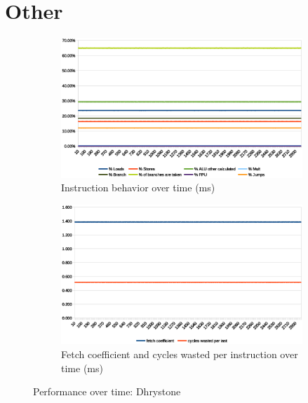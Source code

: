 \documentclass[../bachelor_paper.tex]{subfiles}
\begin{document}
\FloatBarrier
\section{Other}
\begin{figure}
    \begin{subfigure}{0.45\textwidth}
        \includegraphics[width=\textwidth]{img/graph/riscv/dhrystone_inst.eps}
        \caption{Instruction behavior over time (ms)}
    \end{subfigure}
    \begin{subfigure}{0.45\textwidth}
        \includegraphics[width=\textwidth]{img/graph/riscv/dhrystone_fetch_waste.eps}
        \caption{Fetch coefficient and cycles wasted per instruction over time (ms)}
    \end{subfigure}
    \caption{Performance over time: Dhrystone}
\end{figure}
\end{document}
